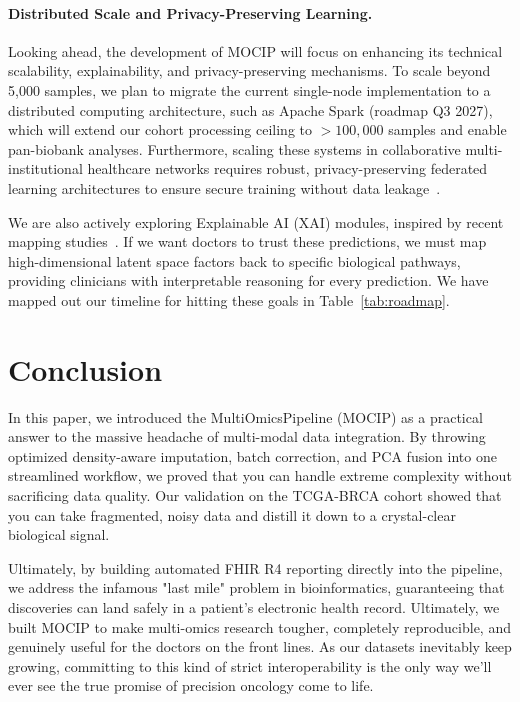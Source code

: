 \documentclass[12pt,a4paper,onecolumn]{article}
\begin{document}
\paragraph{Distributed Scale and Privacy-Preserving Learning.}
Looking ahead, the development of MOCIP will focus on enhancing its technical scalability, explainability, and privacy-preserving mechanisms. To scale beyond 5,000 samples, we plan to migrate the current single-node implementation to a distributed computing architecture, such as Apache Spark (roadmap Q3 2027), which will extend our cohort processing ceiling to $>100,000$ samples and enable pan-biobank analyses. Furthermore, scaling these systems in collaborative multi-institutional healthcare networks requires robust, privacy-preserving federated learning architectures to ensure secure training without data leakage~\cite{ghosh2025privacy}.

We are also actively exploring Explainable AI (XAI) modules, inspired by recent mapping studies~\cite{Leiser2023XAIOmics}. If we want doctors to trust these predictions, we must map high-dimensional latent space factors back to specific biological pathways, providing clinicians with interpretable reasoning for every prediction. We have mapped out our timeline for hitting these goals in Table~\ref{tab:roadmap}.

\section{Conclusion}

In this paper, we introduced the MultiOmicsPipeline (MOCIP) as a practical answer to the massive headache of multi-modal data integration. By throwing optimized density-aware imputation, batch correction, and PCA fusion into one streamlined workflow, we proved that you can handle extreme complexity without sacrificing data quality. Our validation on the TCGA-BRCA cohort showed that you can take fragmented, noisy data and distill it down to a crystal-clear biological signal.

Ultimately, by building automated FHIR R4 reporting directly into the pipeline, we address the infamous "last mile" problem in bioinformatics, guaranteeing that discoveries can land safely in a patient's electronic health record. Ultimately, we built MOCIP to make multi-omics research tougher, completely reproducible, and genuinely useful for the doctors on the front lines. As our datasets inevitably keep growing, committing to this kind of strict interoperability is the only way we'll ever see the true promise of precision oncology come to life.
\end{document}
